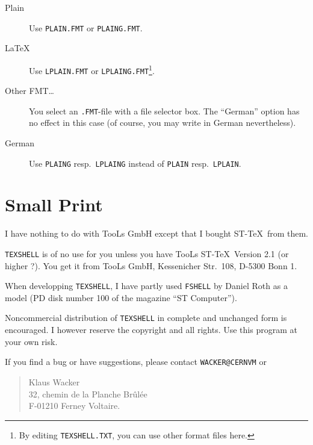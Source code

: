 \begin{description}

\item[Plain]
Use {\tt PLAIN.FMT} or {\tt PLAING.FMT}.

\item[LaTeX]
Use {\tt LPLAIN.FMT} or {\tt LPLAING.FMT}\footnote{
By editing {\tt TEXSHELL.TXT}, you can use other
format files here.}.

\item[Other FMT\ldots]
You select an {\tt .FMT}-file with a file selector box.
The ``German'' option has no effect in this case
(of course, you may write in German nevertheless).

\item[German]
Use  {\tt PLAING} resp.\ {\tt LPLAING}
instead of {\tt PLAIN} resp.\ {\tt LPLAIN}. 
\end{description}

\section*{Small Print}
{\small
I have nothing to do with
TooLs GmbH except that I bought
ST-\TeX\ from them.

{\tt TEX\-SHELL} is of no use for you unless you have
TooLs ST-\TeX\ Version 2.1 (or higher ?).
You get it from TooLs GmbH, Kessenicher Str.~108, D-5300 Bonn 1.

When developping {\tt TEX\-SHELL}, I have partly used {\tt FSHELL}
by Daniel Roth as a model (PD disk number 100 of the 
magazine ``ST Computer'').

Noncommercial distribution of 
{\tt TEX\-SHELL} in complete and unchanged form
is encouraged.
I however reserve the copyright and all rights.
Use this program at your own risk.
}

If you find a bug or have suggestions, please contact
{\tt WACKER@CERNVM} or
\begin{verse}
Klaus Wacker\\
32, chemin de la Planche Br\^ul\'ee\\
F-01210 Ferney Voltaire.\\
\end{verse}


